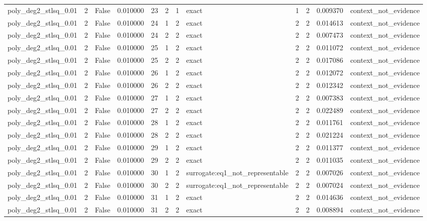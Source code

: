 \begin{tabular}{lrrrrrrlrrrl}
poly\_deg2\_stlsq\_0.01 & 2 & False & 0.010000 & 23 & 2 & 1 & exact & 1 & 2 & 0.009370 & context\_not\_evidence \\
poly\_deg2\_stlsq\_0.01 & 2 & False & 0.010000 & 24 & 1 & 2 & exact & 2 & 2 & 0.014613 & context\_not\_evidence \\
poly\_deg2\_stlsq\_0.01 & 2 & False & 0.010000 & 24 & 2 & 2 & exact & 2 & 2 & 0.007473 & context\_not\_evidence \\
poly\_deg2\_stlsq\_0.01 & 2 & False & 0.010000 & 25 & 1 & 2 & exact & 2 & 2 & 0.011072 & context\_not\_evidence \\
poly\_deg2\_stlsq\_0.01 & 2 & False & 0.010000 & 25 & 2 & 2 & exact & 2 & 2 & 0.017086 & context\_not\_evidence \\
poly\_deg2\_stlsq\_0.01 & 2 & False & 0.010000 & 26 & 1 & 2 & exact & 2 & 2 & 0.012072 & context\_not\_evidence \\
poly\_deg2\_stlsq\_0.01 & 2 & False & 0.010000 & 26 & 2 & 2 & exact & 2 & 2 & 0.012342 & context\_not\_evidence \\
poly\_deg2\_stlsq\_0.01 & 2 & False & 0.010000 & 27 & 1 & 2 & exact & 2 & 2 & 0.007383 & context\_not\_evidence \\
poly\_deg2\_stlsq\_0.01 & 2 & False & 0.010000 & 27 & 2 & 2 & exact & 2 & 2 & 0.022489 & context\_not\_evidence \\
poly\_deg2\_stlsq\_0.01 & 2 & False & 0.010000 & 28 & 1 & 2 & exact & 2 & 2 & 0.011761 & context\_not\_evidence \\
poly\_deg2\_stlsq\_0.01 & 2 & False & 0.010000 & 28 & 2 & 2 & exact & 2 & 2 & 0.021224 & context\_not\_evidence \\
poly\_deg2\_stlsq\_0.01 & 2 & False & 0.010000 & 29 & 1 & 2 & exact & 2 & 2 & 0.011377 & context\_not\_evidence \\
poly\_deg2\_stlsq\_0.01 & 2 & False & 0.010000 & 29 & 2 & 2 & exact & 2 & 2 & 0.011035 & context\_not\_evidence \\
poly\_deg2\_stlsq\_0.01 & 2 & False & 0.010000 & 30 & 1 & 2 & surrogate:eq1\_not\_representable & 2 & 2 & 0.007026 & context\_not\_evidence \\
poly\_deg2\_stlsq\_0.01 & 2 & False & 0.010000 & 30 & 2 & 2 & surrogate:eq1\_not\_representable & 2 & 2 & 0.007024 & context\_not\_evidence \\
poly\_deg2\_stlsq\_0.01 & 2 & False & 0.010000 & 31 & 1 & 2 & exact & 2 & 2 & 0.014636 & context\_not\_evidence \\
poly\_deg2\_stlsq\_0.01 & 2 & False & 0.010000 & 31 & 2 & 2 & exact & 2 & 2 & 0.008894 & context\_not\_evidence \\

\end{tabular}
